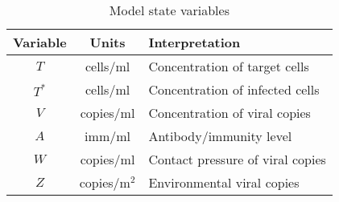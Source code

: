 \documentclass[11pt]{article}
\begin{document}
    \begin{table}[h!]
        \centering
        \caption{Model state variables}
        \vspace{1em}
        \begin{tabular}{ccl} \hline\hline
            Variable    & Units     & Interpretation \\\hline\hline
            $T$         & cells/ml  & Concentration of target cells \\
            $T^*$       & cells/ml  & Concentration of infected cells \\
            $V$         & copies/ml & Concentration of viral copies \\
            $A$         & imm/ml    & Antibody/immunity level \\
            $W$         & copies/ml
                                    & Contact pressure of viral copies \\
            $Z$         & copies/m$^2$
                                    & Environmental viral copies \\
            \hline
        \end{tabular}
        \label{tab:state}
    \end{table}
\end{document}

